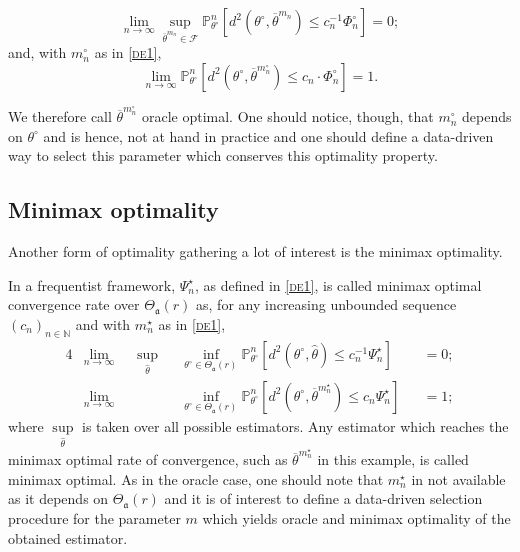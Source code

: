 \[\lim\limits_{n \rightarrow \infty} \sup\limits_{\overline{\theta}^{m_{n}}\in \mathcal{F}} \mathds{P}_{\theta^{\circ}}^{n}\left[d^{2}\left(\theta^{\circ}, \overline{\theta}^{m_{n}}\right) \leq c_{n}^{-1} \Phi_{n}^{\circ} \right] = 0;\]
and, with $m_{n}^{\circ}$ as in \textsc{\cref{de1}},
\[\lim\limits_{n \rightarrow \infty} \mathds{P}_{\theta^{\circ}}^{n}\left[d^{2}\left(\theta^{\circ}, \overline{\theta}^{m_{n}^{\circ}}\right) \leq c_{n} \cdot \Phi_{n}^{\circ} \right] = 1.\]

We therefore call $\overline{\theta}^{m_{n}^{\circ}}$ oracle optimal.
One should notice, though, that $m_{n}^{\circ}$ depends on $\theta^{\circ}$ and is hence, not at hand in practice and one should define a data-driven way to select this parameter which conserves this optimality property.

\subsection{Minimax optimality}\label{2.2}

Another form of optimality gathering a lot of interest is the minimax optimality.

In a frequentist framework, $\Psi_{n}^{\star}$, as defined in \textsc{\cref{de1}}, is called minimax optimal convergence rate over $\Theta_{\mathfrak{a}}(r)$ as, for any increasing unbounded sequence $\left(c_{n}\right)_{n \in \mathds{N}}$ and with $m_{n}^{\star}$ as in \textsc{\cref{de1}},
\begin{alignat*}{4}
& \lim\limits_{n \rightarrow \infty} && \sup\limits_{\widehat{\theta}} &&\inf\limits_{\theta^{\circ} \in \Theta_{\mathfrak{a}}(r)} \mathds{P}_{\theta^{\circ}}^{n}\left[d^{2}(\theta^{\circ}, \widehat{\theta}) \leq c_{n}^{-1} \Psi_{n}^{\star}\right] &&= 0 ;\\
& \lim\limits_{n \rightarrow \infty} && &&\inf\limits_{\theta^{\circ} \in \Theta_{\mathfrak{a}}(r)} \mathds{P}_{\theta^{\circ}}^{n}\left[d^{2}(\theta^{\circ}, \overline{\theta}^{m_{n}^{\star}}) \leq c_{n} \Psi_{n}^{\star} \right] && = 1;
\end{alignat*}
where $\sup\limits_{\widehat{\theta}}$ is taken over all possible estimators.
Any estimator which reaches the minimax optimal rate of convergence, such as $\overline{\theta}^{m_{n}^{\star}}$ in this example, is called minimax optimal.
As in the oracle case, one should note that $m_{n}^{\star}$ in not available as it depends on $\Theta_{\mathfrak{a}}(r)$ and it is of interest to define a data-driven selection procedure for the parameter $m$ which yields oracle and minimax optimality  of the obtained estimator.

